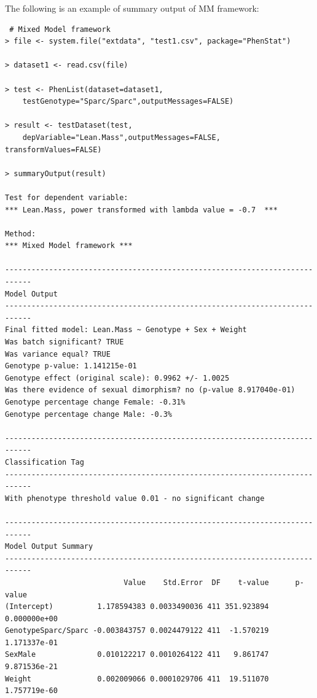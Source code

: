\documentclass[12pt,a4paper]{article}
\begin{document}
The following is an example of summary output of MM framework:
\begingroup
\fontsize{8pt}{12pt}\selectfont
\begin{verbatim}
 # Mixed Model framework
> file <- system.file("extdata", "test1.csv", package="PhenStat") 

> dataset1 <- read.csv(file)

> test <- PhenList(dataset=dataset1,
    testGenotype="Sparc/Sparc",outputMessages=FALSE)
    
> result <- testDataset(test,
    depVariable="Lean.Mass",outputMessages=FALSE, transformValues=FALSE)

> summaryOutput(result)

Test for dependent variable:
*** Lean.Mass, power transformed with lambda value = -0.7  ***

Method:
*** Mixed Model framework ***

----------------------------------------------------------------------------
Model Output
----------------------------------------------------------------------------
Final fitted model: Lean.Mass ~ Genotype + Sex + Weight
Was batch significant? TRUE
Was variance equal? TRUE
Genotype p-value: 1.141215e-01
Genotype effect (original scale): 0.9962 +/- 1.0025
Was there evidence of sexual dimorphism? no (p-value 8.917040e-01)
Genotype percentage change Female: -0.31%
Genotype percentage change Male: -0.3%

----------------------------------------------------------------------------
Classification Tag
----------------------------------------------------------------------------
With phenotype threshold value 0.01 - no significant change

----------------------------------------------------------------------------
Model Output Summary
----------------------------------------------------------------------------
                           Value    Std.Error  DF    t-value      p-value
(Intercept)          1.178594383 0.0033490036 411 351.923894 0.000000e+00
GenotypeSparc/Sparc -0.003843757 0.0024479122 411  -1.570219 1.171337e-01
SexMale              0.010122217 0.0010264122 411   9.861747 9.871536e-21
Weight               0.002009066 0.0001029706 411  19.511070 1.757719e-60
\end{verbatim}
\endgroup
\end{document}
